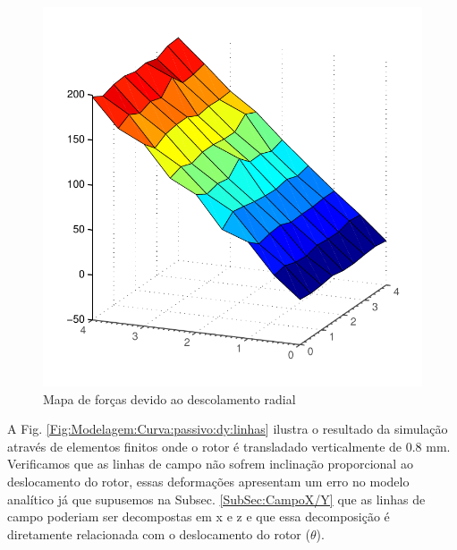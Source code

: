 \begin{figure}[!ht]
\centering
\includegraphics[width=0.7\linewidth]{Figs/Simulacoes/Passivo2/passivo_otimizado_fem_plano}
\caption{Mapa de forças devido ao descolamento radial}
\label{fig:passivo_otimizado_fem_plano}
\end{figure}


A Fig. \ref{Fig:Modelagem:Curva:passivo:dy:linhas} ilustra o resultado da simulação através de elementos finitos onde o rotor é transladado verticalmente de 0.8 mm. Verificamos que as linhas de campo não sofrem inclinação proporcional ao deslocamento do rotor, essas deformações apresentam um erro no modelo analítico já que supusemos na Subsec. \ref{SubSec:CampoX/Y} que as linhas de campo poderiam ser decompostas em x e z e que essa decomposição é diretamente relacionada com o deslocamento do rotor ($\theta$). 

